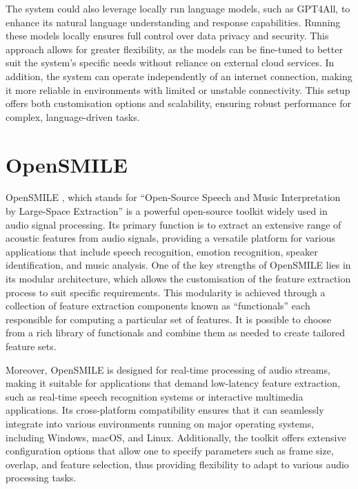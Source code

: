 The system could also leverage locally run language models, such as GPT4All, to enhance its natural language understanding and response capabilities. Running these models locally ensures full control over data privacy and security. This approach allows for greater flexibility, as the models can be fine-tuned to better suit the system's specific needs without reliance on external cloud services. In addition, the system can operate independently of an internet connection, making it more reliable in environments with limited or unstable connectivity. This setup offers both customisation options and scalability, ensuring robust performance for complex, language-driven tasks.

\section{OpenSMILE}

OpenSMILE \cite{opensmile-2010}, which stands for ``Open-Source Speech and Music Interpretation by Large-Space Extraction'' is a powerful open-source toolkit widely used in audio signal processing. Its primary function is to extract an extensive range of acoustic features from audio signals, providing a versatile platform for various applications that include speech recognition, emotion recognition, speaker identification, and music analysis. One of the key strengths of OpenSMILE lies in its modular architecture, which allows the customisation of the feature extraction process to suit specific requirements. This modularity is achieved through a collection of feature extraction components known as ``functionals'' each responsible for computing a particular set of features. It is possible to choose from a rich library of functionals and combine them as needed to create tailored feature sets.

Moreover, OpenSMILE is designed for real-time processing of audio streams, making it suitable for applications that demand low-latency feature extraction, such as real-time speech recognition systems or interactive multimedia applications. Its cross-platform compatibility ensures that it can seamlessly integrate into various environments running on major operating systems, including Windows, macOS, and Linux. Additionally, the toolkit offers extensive configuration options that allow one to specify parameters such as frame size, overlap, and feature selection, thus providing flexibility to adapt to various audio processing tasks.

